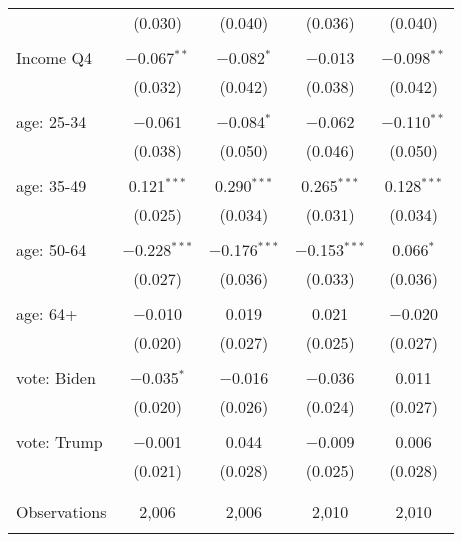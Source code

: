 \begin{tabular}{@{\extracolsep{5pt}}lcccc}
  & (0.030) & (0.040) & (0.036) & (0.040) \\ 
  & & & & \\ 
 Income Q4 & $-$0.067$^{**}$ & $-$0.082$^{*}$ & $-$0.013 & $-$0.098$^{**}$ \\ 
  & (0.032) & (0.042) & (0.038) & (0.042) \\ 
  & & & & \\ 
 age: 25-34 & $-$0.061 & $-$0.084$^{*}$ & $-$0.062 & $-$0.110$^{**}$ \\ 
  & (0.038) & (0.050) & (0.046) & (0.050) \\ 
  & & & & \\ 
 age: 35-49 & 0.121$^{***}$ & 0.290$^{***}$ & 0.265$^{***}$ & 0.128$^{***}$ \\ 
  & (0.025) & (0.034) & (0.031) & (0.034) \\ 
  & & & & \\ 
 age: 50-64 & $-$0.228$^{***}$ & $-$0.176$^{***}$ & $-$0.153$^{***}$ & 0.066$^{*}$ \\ 
  & (0.027) & (0.036) & (0.033) & (0.036) \\ 
  & & & & \\ 
 age: 64+ & $-$0.010 & 0.019 & 0.021 & $-$0.020 \\ 
  & (0.020) & (0.027) & (0.025) & (0.027) \\ 
  & & & & \\ 
 vote: Biden & $-$0.035$^{*}$ & $-$0.016 & $-$0.036 & 0.011 \\ 
  & (0.020) & (0.026) & (0.024) & (0.027) \\ 
  & & & & \\ 
 vote: Trump & $-$0.001 & 0.044 & $-$0.009 & 0.006 \\ 
  & (0.021) & (0.028) & (0.025) & (0.028) \\ 
  & & & & \\ 
\hline \\[-1.8ex] 

Observations & 2,006 & 2,006 & 2,010 & 2,010 \\ 
\hline 
\hline \\[-1.8ex] 
\end{tabular} 